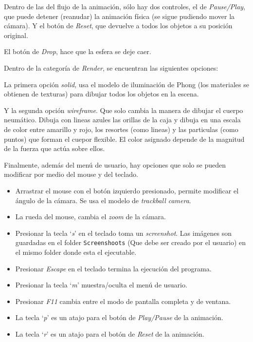 Dentro de las del flujo de la animación, sólo hay dos controles, el de \emph{\textenglish{Pause/Play}}, que puede detener (reanudar) la animación física (se sigue pudiendo mover la cámara).
Y el botón de \emph{\textenglish{Reset}}, que devuelve a todos los objetos a su posición original.

El botón de \emph{\textenglish{Drop}}, hace que la esfera se deje caer.

Dentro de la categoría de \emph{\textenglish{Render}}, se encuentran las siguientes opciones:

La primera opción \emph{\textenglish{solid}}, usa el modelo de iluminación de Phong (los materiales se obtienen de texturas) para dibujar todos los objetos en la escena.

Y la segunda opción \emph{\textenglish{wireframe}}. 
Que solo cambia la manera de dibujar el cuerpo neumático.
Dibuja con lineas azules las orillas de la caja y dibuja en una escala de color entre amarillo y rojo, los resortes (como lineas) y las particulas (como puntos) que forman el cuepor flexible.
El color asignado depende de la magnitud de la fuerza que actúa sobre ellos.

Finalmente, además del menú de usuario, hay opciones que solo se pueden modificar por medio del \textenglish{mouse} y del teclado.

\begin{itemize}
 \item Arrastrar el mouse con el botón izquierdo presionado, permite modificar el ángulo de la cámara. Se usa el modelo de \emph{\textenglish{trackball camera}}.
 \item La rueda del mouse, cambia el \emph{\textenglish{zoom}} de la cámara.
 \item Presionar la tecla `\emph{s}' en el teclado toma un \emph{\textenglish{screenshot}}. Las imágenes son guardadas en el folder \texttt{Screenshoots} (Que debe ser creado por el usuario) en el mismo folder donde esta el ejecutable.
 \item Presionar \emph{Escape} en el teclado termina la ejecución del programa.
 \item Presionar la tecla `\emph{m}' muestra/oculta el menú de usuario.
 \item Presionar \emph{F11} cambia entre el modo de pantalla completa y de ventana.
 \item La tecla `\emph{p}' es un atajo para el botón de \emph{\textenglish{Play/Pause}} de la animación.
 \item La tecla `\emph{r}' es un atajo para el botón de \emph{\textenglish{Reset}} de la animación.
\end{itemize}

